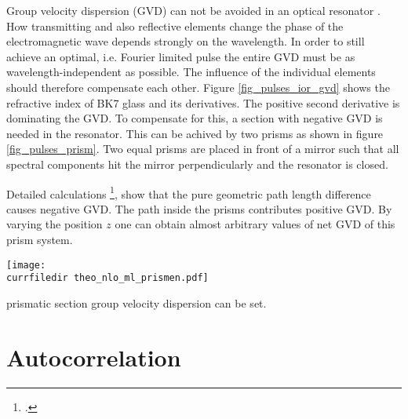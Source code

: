 Group velocity dispersion (GVD) can not be avoided  in an
optical resonator . How transmitting and
also reflective elements change the phase of the
electromagnetic wave  depends strongly on the wavelength. In order to still achieve an optimal, i.e. Fourier limited pulse
the entire GVD must be as wavelength-independent as possible. The influence of the individual elements should therefore 
compensate  each other. Figure
\ref{fig_pulses_ior_gvd} shows the refractive index
of BK7 glass and its derivatives. The positive second derivative
is dominating  the GVD. To compensate for this, a section with
negative GVD is needed in the resonator. This can be  achived by two prisms as shown in figure
\ref{fig_pulses_prism}. Two equal
prisms are placed in front of a mirror such 
that all spectral components hit the mirror perpendicularly
and  the resonator is closed.  

 Detailed calculations \footcite{DielsRudolph1996},
show that the pure geometric path length difference causes 
negative GVD. The path inside the prisms contributes  positive GVD.  By varying the position $z$ one can obtain almost arbitrary values of net GVD of this prism system.


\begin{marginfigure}
\center
\texttt{[image: \\currfiledir theo\_nlo\_ml\_prismen.pdf]}
\caption{prismatic section
group velocity dispersion can be set.}
\label{fig_pulses_prism}
\end{marginfigure}

\section{Autocorrelation}

